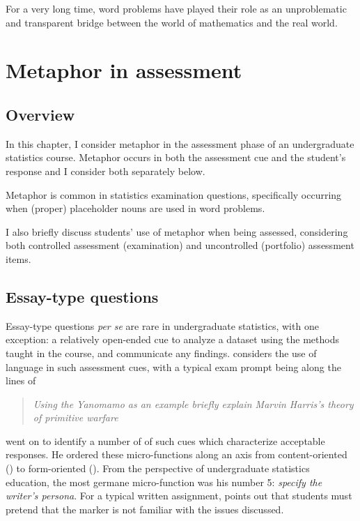 \begin{singlespace}
\begin{savequote}[105mm]
For a very long time, word problems have played
  their role as an unproblematic and transparent bridge between the
  world of mathematics and the real world.
\qauthor{}
\end{savequote}
\end{singlespace}

\chapter{Metaphor in assessment}
\label{chapter6}

\section{Overview}

In this chapter, I consider metaphor in the assessment phase of an
undergraduate statistics course.  Metaphor occurs in both the
assessment cue and the student's response and I consider both
separately below.

Metaphor is common in statistics examination questions, specifically
occurring when (proper) placeholder nouns are used in word problems.

I also briefly discuss students' use of metaphor when being assessed,
considering both controlled assessment (examination) and uncontrolled
(portfolio) assessment items.

\section{Essay-type questions}

Essay-type questions {\em per se} are rare in undergraduate
statistics, with one exception: a relatively open-ended cue to analyze
a dataset using the methods taught in the course, and communicate any
findings.   considers the use of language in such
assessment cues, with a typical exam prompt being along the lines of

\begin{quote}
  \emph{Using the Yanomamo as an example briefly explain Marvin
    Harris's theory of primitive warfare}
\end{quote}
  
\noindent\citeauthor{horowitz1986} went on to identify a number of
 of such cues which characterize acceptable
responses.  He ordered these micro-functions along an axis from
content-oriented () to form-oriented
().  From the perspective of
undergraduate statistics education, the most germane micro-function
was his number 5: \emph{specify the writer's persona}.  For a typical
written assignment,  points out that students
must pretend that the marker is not familiar with the issues
discussed.

